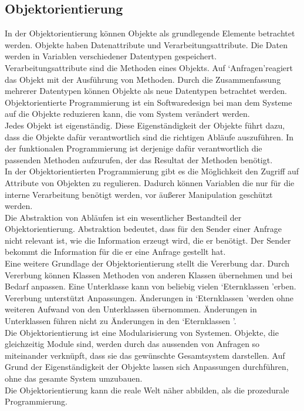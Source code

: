 \documentclass[12pt,a4paper]{article}
\begin{document}
\subsection{Objektorientierung}
\label{Objektorientierung}
In der Objektorientierung können Objekte als grundlegende Elemente betrachtet werden. Objekte haben Datenattribute und Verarbeitungsattribute. Die Daten werden in Variablen verschiedener Datentypen gespeichert. Verarbeitungsattribute sind die Methoden eines Objekts. Auf \lq Anfragen\rq\space reagiert das Objekt mit der Ausführung von Methoden. Durch die Zusammenfassung mehrerer Datentypen können Objekte als neue Datentypen betrachtet werden.\\
Objektorientierte Programmierung ist ein Softwaredesign bei man dem Systeme auf die Objekte reduzieren kann, die vom System verändert werden.\\
Jedes Objekt ist eigenständig. Diese Eigenständigkeit der Objekte führt dazu, dass die Objekte dafür verantwortlich sind die richtigen Abläufe auszuführen. In der funktionalen Programmierung ist derjenige dafür verantwortlich die passenden Methoden aufzurufen, der das Resultat der Methoden benötigt.\\
In der Objektorientierten Programmierung gibt es die Möglichkeit den Zugriff auf Attribute von Objekten zu regulieren. Dadurch können Variablen die nur für die interne Verarbeitung benötigt werden, vor äußerer Manipulation geschützt werden.\\
Die Abstraktion von Abläufen ist ein wesentlicher Bestandteil der Objektorientierung. Abstraktion bedeutet, dass für den Sender einer Anfrage nicht relevant ist, wie die Information erzeugt wird, die er benötigt. Der Sender bekommt die Information für die er eine Anfrage gestellt hat. \\
Eine weitere Grundlage der Objektorientierung stellt die Vererbung dar. Durch Vererbung können Klassen Methoden von anderen Klassen übernehmen und bei Bedarf anpassen. Eine Unterklasse kann von beliebig vielen \lq Eternklassen \rq\space erben. Vererbung unterstützt Anpassungen. Änderungen in \lq Eternklassen \rq\space werden ohne weiteren Aufwand von den Unterklassen übernommen. Änderungen in Unterklassen führen nicht zu Änderungen in den  \lq Eternklassen \rq\space.\\
Die Objektorientierung ist eine Modularisierung von Systemen. Objekte, die gleichzeitig Module sind, werden durch das aussenden von Anfragen so miteinander verknüpft, dass sie das gewünschte Gesamtsystem darstellen. Auf Grund der Eigenständigkeit der Objekte lassen sich Anpassungen durchführen, ohne das gesamte System umzubauen.\\
Die Objektorientierung kann die reale Welt näher abbilden, als die prozedurale Programmierung\cite{10.1145/71605.71612}.
\end{document}
